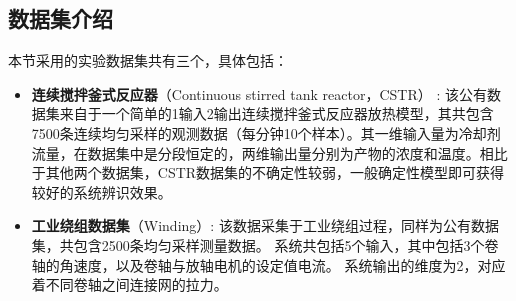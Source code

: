 \subsection{数据集介绍}
本节采用的实验数据集共有三个，具体包括：
\begin{itemize}
    \item \textbf{连续搅拌釜式反应器}（Continuous stirred tank reactor，CSTR） \cite{Demeester2019}:
    该公有数据集来自于一个简单的1输入2输出连续搅拌釜式反应器放热模型，其共包含7500条连续均匀采样的观测数据（每分钟10个样本）。其一维输入量为冷却剂流量，在数据集中是分段恒定的，两维输出量分别为产物的浓度和温度。相比于其他两个数据集，CSTR数据集的不确定性较弱，一般确定性模型即可获得较好的系统辨识效果。
    
    \item \textbf{工业绕组数据集}（Winding）\cite{Demeester2019}: 
    该数据采集于工业绕组过程，同样为公有数据集，共包含2500条均匀采样测量数据。
    系统共包括5个输入，其中包括3个卷轴的角速度，以及卷轴与放轴电机的设定值电流。
    系统输出的维度为2，对应着不同卷轴之间连接网的拉力。
    

\end{itemize}
